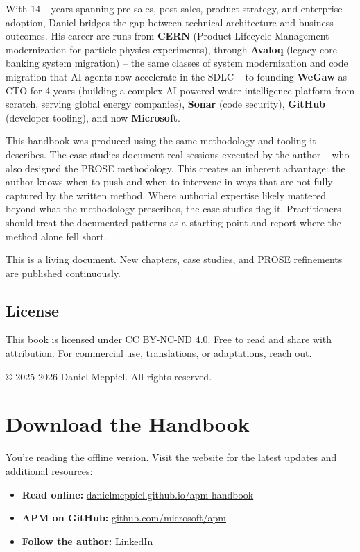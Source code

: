 \documentclass[
  a4paper,
  DIV=11,
  numbers=noendperiod]{scrreprt}
\providecommand{\tightlist}{%
  \setlength{\itemsep}{0pt}\setlength{\parskip}{0pt}}
\begin{document}
With 14+ years spanning pre-sales, post-sales, product strategy, and
enterprise adoption, Daniel bridges the gap between technical
architecture and business outcomes. His career arc runs from
\textbf{CERN} (Product Lifecycle Management modernization for particle
physics experiments), through \textbf{Avaloq} (legacy core-banking
system migration) -- the same classes of system modernization and code
migration that AI agents now accelerate in the SDLC -- to founding
\textbf{WeGaw} as CTO for 4 years (building a complex AI-powered water
intelligence platform from scratch, serving global energy companies),
\textbf{Sonar} (code security), \textbf{GitHub} (developer tooling), and
now \textbf{Microsoft}.

This handbook was produced using the same methodology and tooling it
describes. The case studies document real sessions executed by the
author -- who also designed the PROSE methodology. This creates an
inherent advantage: the author knows when to push and when to intervene
in ways that are not fully captured by the written method. Where
authorial expertise likely mattered beyond what the methodology
prescribes, the case studies flag it. Practitioners should treat the
documented patterns as a starting point and report where the method
alone fell short.

This is a living document. New chapters, case studies, and PROSE
refinements are published continuously.

\section{License}\label{license}

This book is licensed under
\href{https://creativecommons.org/licenses/by-nc-nd/4.0/}{CC BY-NC-ND
4.0}. Free to read and share with attribution. For commercial use,
translations, or adaptations,
\href{https://www.linkedin.com/in/danielmeppiel/}{reach out}.

© 2025-2026 Daniel Meppiel. All rights reserved.


\chapter{Download the Handbook}\label{download-the-handbook}

You're reading the offline version. Visit the website for the latest
updates and additional resources:

\begin{itemize}
\tightlist
\item
  \textbf{Read online:}
  \href{https://danielmeppiel.github.io/apm-handbook/}{danielmeppiel.github.io/apm-handbook}
\item
  \textbf{APM on GitHub:}
  \href{https://github.com/microsoft/apm}{github.com/microsoft/apm}
\item
  \textbf{Follow the author:}
  \href{https://www.linkedin.com/in/danielmeppiel/}{LinkedIn}
\end{itemize}
\end{document}
